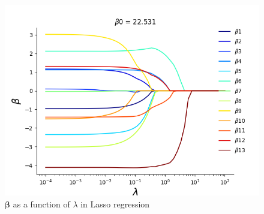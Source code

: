 \documentclass[11pt]{article}
\newcommand{\mfile}[1]  {{\small }} %
\begin{document}
\begin{enumerate}
	\mfile{prob4-5.txt}
	\begin{figure}
		\centering\includegraphics[width=.75\linewidth]{4_5_fig.png}
		\caption{$\bm{\beta}$ as a function of $\lambda$ in Lasso regression} %
		\label{fig:p4-5}  %
	\end{figure}
\end{enumerate}
\end{document}
